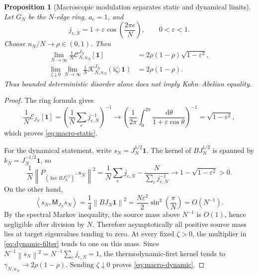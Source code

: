 \documentclass[11pt]{article}
\newtheorem{proposition}[theorem]{Proposition}
\theoremstyle{definition}
\theoremstyle{remark}
\newcommand{\I}{\mathrm i}
\newcommand{\cC}{\mathcal C}
\newcommand{\cK}{\mathcal K}
\newcommand{\cE}{\mathcal E}
\newcommand{\ip}[2]{\left\langle #1,#2\right\rangle}
\newcommand{\norm}[1]{\left\lVert #1\right\rVert}
\newcommand{\dd}{\,\mathrm d}
\newcommand{\eps}{\varepsilon}
\begin{document}
\begin{proposition}[Macroscopic modulation separates static and dynamical limits]
\label{prop:macro-counterexample}
Let $G_N$ be the $N$-edge ring, $a_e=1$, and
\begin{equation}
 j_{e,N}=1+\eps\cos\left(\frac{2\pi e}{N}\right),
 \qquad 0<\eps<1.
 \label{eq:macro-j}
\end{equation}
Choose $n_N/N\to\rho\in(0,1)$.  Then
\begin{align}
 \lim_{N\to\infty}\frac1N\cC_{N,n_N}^{J_N}[\bm{1}]
 &=2\rho(1-\rho)\sqrt{1-\eps^2},
 \label{eq:macro-static}\\
 \lim_{\zeta\downarrow0}\lim_{N\to\infty}
 \frac1N\cK_{N,n_N}^{J_N}(\I\zeta;\bm{1})
 &=2\rho(1-\rho).
 \label{eq:macro-dynamic}
\end{align}
Thus bounded deterministic disorder alone does not imply Kohn--Abelian equality.
\end{proposition}

\begin{proof}
The ring formula gives
\[
 \frac1N\cE_{J_N}[\bm{1}]
 =\left(\frac1N\sum_ej_{e,N}^{-1}\right)^{-1}
 \longrightarrow
 \left(\frac1{2\pi}\int_0^{2\pi}\frac{\dd\theta}{1+\eps\cos\theta}\right)^{-1}
 =\sqrt{1-\eps^2},
\]
which proves \eqref{eq:macro-static}.

For the dynamical statement, write $s_N=J_N^{1/2}\bm{1}$.  The kernel of
$BJ_N^{1/2}$ is spanned by $k_N=J_N^{-1/2}\bm{1}$, so
\begin{equation}
 \frac1N\norm{P_{(\ker BJ_N^{1/2})^\perp}s_N}^2
 =\frac1N\sum_ej_{e,N}
 -\frac{N}{\sum_ej_{e,N}^{-1}}
 \longrightarrow1-\sqrt{1-\eps^2}>0.
 \label{eq:macro-positive-mass}
\end{equation}
On the other hand,
\begin{equation}
 \ip{s_N}{\mathsf M_{J_N}s_N}
 =\frac14\norm{BJ_N\bm{1}}^2
 =\frac{N\eps^2}{2}\sin^2\left(\frac\pi N\right)
 =O(N^{-1}).
 \label{eq:macro-first-moment}
\end{equation}
By the spectral Markov inequality, the source mass above $N^{-1}$ is $O(1)$, hence negligible after division by $N$.  Therefore asymptotically all positive source mass lies at target eigenvalues tending to zero.  At every fixed $\zeta>0$, the multiplier in \eqref{eq:dynamic-filter} tends to one on this mass.  Since $N^{-1}\norm{s_N}^2=N^{-1}\sum_ej_{e,N}=1$, the thermodynamic-first kernel tends to $\gamma_{N,n_N}\to2\rho(1-\rho)$.  Sending $\zeta\downarrow0$ proves \eqref{eq:macro-dynamic}.
\end{proof}
\end{document}
